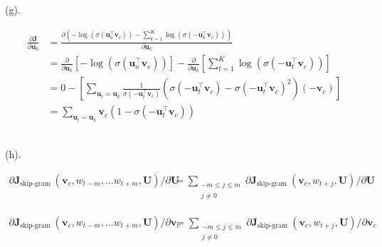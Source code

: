 \documentclass{article}
\begin{document}
~\\

(g).

\begin{equation*}
  \begin{aligned}
    \frac{\partial \boldsymbol{J}}{\partial \boldsymbol{u}_k} &= \frac{\partial (-\log \left(\sigma\left(\boldsymbol{u}_{o}^{\top} \boldsymbol{v}_{c}\right)\right)-\sum_{k=1}^{K} \log \left(\sigma\left(-\boldsymbol{u}_{k}^{\top} \boldsymbol{v}_{c}\right)\right))}{\partial \boldsymbol{u}_k} \\ 
    & = \frac{\partial}{\partial \boldsymbol{u}_k} \left[- \log (\sigma(\boldsymbol{u}_{o}^{\top} \boldsymbol{v}_{c}))\right] - \frac{\partial}{\partial \boldsymbol{u}_k}\left[\sum_{t=1}^{K} \log (\sigma(-\boldsymbol{u}_{t}^{\top} \boldsymbol{v}_{c}))\right] \\
    & = 0 - \left[\sum_{\boldsymbol{u}_t = \boldsymbol{u}_k}\frac{1}{\sigma(-\boldsymbol{u}_{t}^{\top} \boldsymbol{v}_{c})} \left(\sigma(-\boldsymbol{u}_{t}^{\top} \boldsymbol{v}_{c}) - \sigma(-\boldsymbol{u}_{t}^{\top} \boldsymbol{v}_{c})^2\right)(-\boldsymbol{v}_{c})\right] \\ 
    & = \sum_{\boldsymbol{u}_t = \boldsymbol{u}_k}\boldsymbol{v}_{c}\left(1-\sigma(-\boldsymbol{u}_{t}^{\top} \boldsymbol{v}_{c})\right)
  \end{aligned}
\end{equation*}

~\\

(h). 

\begin{equation*}
  \begin{aligned}
    \partial \boldsymbol{J}_{\text {skip-gram }}\left(\boldsymbol{v}_{c}, w_{t-m}, \ldots w_{t+m}, \boldsymbol{U}\right) / \partial \boldsymbol{U} &= \sum_{\substack{-m \leq j \leq m \\ j \neq 0}} \partial \boldsymbol{J}_{\text {skip-gram }}\left(\boldsymbol{v}_{c}, w_{t+j}, \boldsymbol{U}\right) / \partial \boldsymbol{U}
  \end{aligned}
\end{equation*}

\begin{equation*}
  \begin{aligned}
    \partial \boldsymbol{J}_{\text {skip-gram }}\left(\boldsymbol{v}_{c}, w_{t-m}, \ldots w_{t+m}, \boldsymbol{U}\right) / \partial \boldsymbol{v}_c &= \sum_{\substack{-m \leq j \leq m \\ j \neq 0}} \partial \boldsymbol{J}_{\text {skip-gram }}\left(\boldsymbol{v}_{c}, w_{t+j}, \boldsymbol{U}\right) / \partial \boldsymbol{v}_c
  \end{aligned}
\end{equation*}
\end{document}

